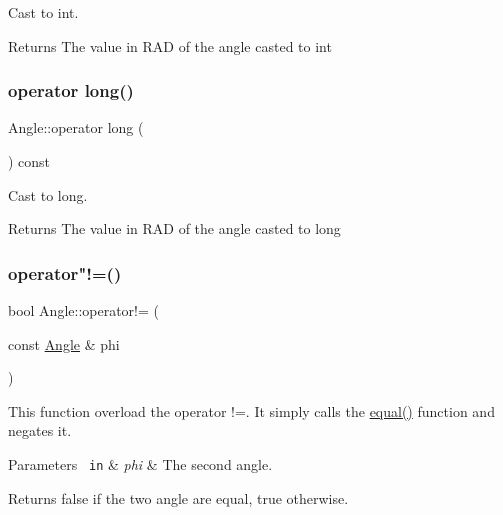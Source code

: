 Cast to int. 

\begin{DoxyReturn}{Returns}
The value in R\+AD of the angle casted to int 
\end{DoxyReturn}
\mbox{\label{class_angle_a497355a5d68f92e7801ee4072e234185}} 
\subsubsection{\texorpdfstring{operator long()}{operator long()}}
{\footnotesize\ttfamily Angle\+::operator long (\begin{DoxyParamCaption}{ }\end{DoxyParamCaption}) const\hspace{0.3cm}{\ttfamily [inline]}}



Cast to long. 

\begin{DoxyReturn}{Returns}
The value in R\+AD of the angle casted to long 
\end{DoxyReturn}
\mbox{\label{class_angle_a8d22835be41b628a5216243b7f7e50a1}} 
\subsubsection{\texorpdfstring{operator"!=()}{operator!=()}}
{\footnotesize\ttfamily bool Angle\+::operator!= (\begin{DoxyParamCaption}\item[{const \mbox{\hyperlink{class_angle}{Angle}} \&}]{phi }\end{DoxyParamCaption})\hspace{0.3cm}{\ttfamily [inline]}}

This function overload the operator !=. It simply calls the {\ttfamily \mbox{\hyperlink{class_angle_a21d2e7c68957afdd5c7edf3efd3e0bdc}{equal()}}} function and negates it. 
\begin{DoxyParams}[1]{Parameters}
\mbox{\texttt{ in}}  & {\em phi} & The second angle. \\
\hline
\end{DoxyParams}
\begin{DoxyReturn}{Returns}
{\ttfamily false} if the two angle are equal, {\ttfamily true} otherwise. 
\end{DoxyReturn}
\mbox{\label{class_angle_aa04bc36c641e1ecfb7aee5019ed8e6ea}} 
